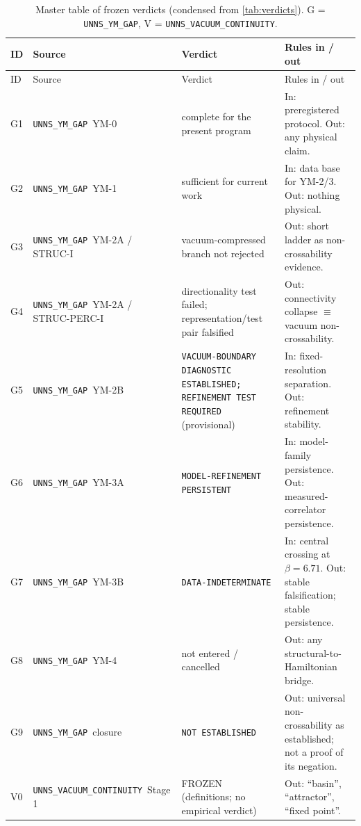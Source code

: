 \documentclass[11pt,a4paper]{article}
\theoremstyle{definition}
\theoremstyle{remark}
\begin{document}
{\footnotesize
\setlength{\tabcolsep}{3pt}
\begin{longtable}{@{}l>{\raggedright\arraybackslash}p{3.3cm}>{\raggedright\arraybackslash}p{4.7cm}>{\raggedright\arraybackslash}p{6.4cm}@{}}
\caption{Master table of frozen verdicts (condensed from \cref{tab:verdicts}). G = \texttt{UNNS\_YM\_GAP}, V = \texttt{UNNS\_VACUUM\_CONTINUITY}.}\label{tab:master}\\
\toprule ID & Source & Verdict & Rules in / out\\\midrule\endfirsthead
\toprule ID & Source & Verdict & Rules in / out\\\midrule\endhead
\bottomrule\endfoot
G1 & \texttt{UNNS\_YM\_GAP}\ YM-0 & complete for the present program & In: preregistered protocol. Out: any physical claim.\\[2pt]
G2 & \texttt{UNNS\_YM\_GAP}\ YM-1 & sufficient for current work & In: data base for YM-2/3. Out: nothing physical.\\[2pt]
G3 & \texttt{UNNS\_YM\_GAP}\ YM-2A / STRUC-I & vacuum-compressed branch not rejected & Out: short ladder as non-crossability evidence.\\[2pt]
G4 & \texttt{UNNS\_YM\_GAP}\ YM-2A / STRUC-PERC-I & directionality test failed; representation/test pair falsified & Out: connectivity collapse $\equiv$ vacuum non-crossability.\\[2pt]
G5 & \texttt{UNNS\_YM\_GAP}\ YM-2B & \texttt{VACUUM-\allowbreak{}BOUNDARY DIAGNOSTIC ESTABLISHED; REFINEMENT TEST REQUIRED} (provisional) & In: fixed-resolution separation. Out: refinement stability.\\[2pt]
G6 & \texttt{UNNS\_YM\_GAP}\ YM-3A & \texttt{MODEL-\allowbreak{}REFINEMENT PERSISTENT} & In: model-family persistence. Out: measured-correlator persistence.\\[2pt]
G7 & \texttt{UNNS\_YM\_GAP}\ YM-3B & \texttt{DATA-\allowbreak{}INDETERMINATE} & In: central crossing at $\beta=6.71$. Out: stable falsification; stable persistence.\\[2pt]
G8 & \texttt{UNNS\_YM\_GAP}\ YM-4 & not entered / cancelled & Out: any structural-to-Hamiltonian bridge.\\[2pt]
G9 & \texttt{UNNS\_YM\_GAP}\ closure & \texttt{NOT ESTABLISHED} & Out: universal non-crossability as established; not a proof of its negation.\\[2pt]
\midrule
V0 & \texttt{UNNS\_VACUUM\_\allowbreak CONTINUITY}\ Stage 1 & FROZEN (definitions; no empirical verdict) & Out: ``basin\textquotedblright{}, ``attractor\textquotedblright{}, ``fixed point\textquotedblright{}.\\[2pt]

\end{longtable}}
\end{document}
